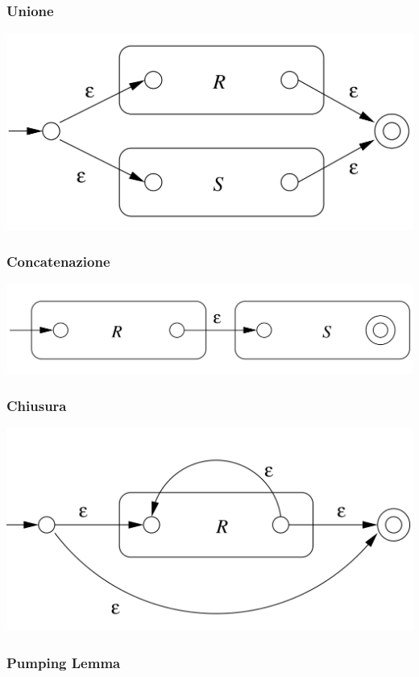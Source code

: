 \documentclass[12pt]{article}
\begin{document}
\subsubsection*{Unione}
\includegraphics[scale=0.07]{assets/unione.png}
\subsubsection*{Concatenazione}
\includegraphics[scale=0.07]{assets/concatenazione.png}
\subsubsection*{Chiusura}
\includegraphics[scale=0.07]{assets/chiusura.png}

\subsubsection{Pumping Lemma}
\end{document}
